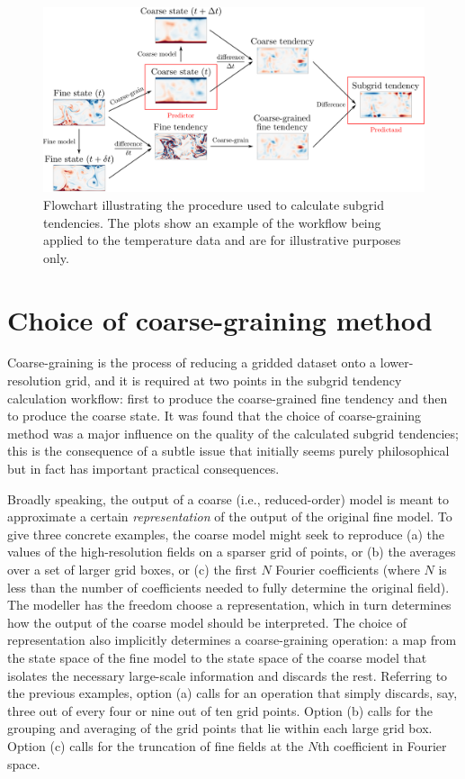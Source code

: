 \documentclass[../main.tex]{subfiles}
\begin{document}
\begin{figure}[ht]
    \centering
    \includegraphics[width=\linewidth]{figures/method.pdf}
    \caption{
        Flowchart illustrating the procedure used to calculate
        subgrid tendencies. The plots show an example of the workflow being
        applied to the temperature data and are for illustrative purposes only.
    }
    \label{fig:method}
\end{figure}


\section{Choice of coarse-graining method} \label{sec:coarse_graining}
Coarse-graining is the process of reducing a gridded dataset onto a
lower-resolution grid, and it is required at two points in the subgrid tendency
calculation workflow: first to produce the coarse-grained fine tendency and
then to produce the coarse state. It was found that the choice of
coarse-graining method was a major influence on the quality of the calculated
subgrid tendencies; this is the consequence of a subtle issue that initially
seems purely philosophical but in fact has important practical consequences.

Broadly speaking, the output of a coarse (i.e., reduced-order) model is meant
to approximate a certain \emph{representation} of the output of the original
fine model. To give three concrete examples, the coarse model might seek to
reproduce (a) the values of the high-resolution fields on a sparser grid of
points, or (b) the averages over a set of larger grid boxes, or (c) the first
$N$ Fourier coefficients (where $N$ is less than the number of coefficients
needed to fully determine the original field). The modeller has the freedom
choose a representation, which in turn determines how the output of the coarse
model should be interpreted. The choice of representation also implicitly
determines a coarse-graining operation: a map from the state space of the fine
model to the state space of the coarse model that isolates the necessary
large-scale information and discards the rest. Referring to the previous
examples, option (a) calls for an operation that simply discards, say, three
out of every four or nine out of ten grid points. Option (b) calls for the
grouping and averaging of the grid points that lie within each large grid box.
Option (c) calls for the truncation of fine fields at the $N$th coefficient in
Fourier space.
\end{document}
